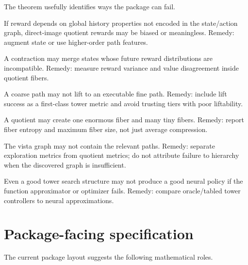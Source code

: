 \documentclass[11pt]{article}
\begin{document}
The theorem usefully identifies ways the package can fail.

\begin{description}[leftmargin=2.6cm,style=nextline]
    \item[Nonlocal reward.] If reward depends on global history properties not encoded in the state/action graph, direct-image quotient rewards may be biased or meaningless.  Remedy: augment state or use higher-order path features.

    \item[Bad contraction.] A contraction may merge states whose future reward distributions are incompatible.  Remedy: measure reward variance and value disagreement inside quotient fibers.

    \item[Non-liftability.] A coarse path may not lift to an executable fine path.  Remedy: include lift success as a first-class tower metric and avoid trusting tiers with poor liftability.

    \item[Unbalanced fibers.] A quotient may create one enormous fiber and many tiny fibers.  Remedy: report fiber entropy and maximum fiber size, not just average compression.

    \item[Coverage failure.] The vista graph may not contain the relevant paths.  Remedy: separate exploration metrics from quotient metrics; do not attribute failure to hierarchy when the discovered graph is insufficient.

    \item[Optimization failure.] Even a good tower search structure may not produce a good neural policy if the function approximator or optimizer fails.  Remedy: compare oracle/tabled tower controllers to neural approximations.
\end{description}

\section{Package-facing specification}

The current package layout suggests the following mathematical roles.
\end{document}
